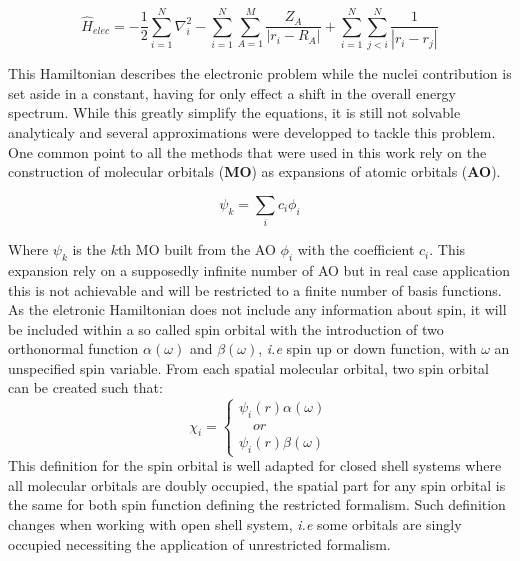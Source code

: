 \documentclass{article}
\begin{document}
\begin{equation}\label{Helec}
    \hat{H}_{elec}=-\frac{1}{2}\sum_{i=1}^{N}\nabla_i^2%
    -\sum_{i=1}^{N}\sum_{A=1}^{M}\frac{Z_A}{|r_i-R_A|}+\sum_{i=1}^{N}\sum_{j<i}^{N}\frac{1}{|r_i-r_j|}%
\end{equation}

This Hamiltonian describes the electronic problem while the nuclei contribution is set aside in a constant, having for only effect a shift in the overall energy spectrum. 
While this greatly simplify the equations, it is still not solvable analyticaly and several approximations were developped to tackle this problem. %
One common point to all the methods that were used in this work rely on the construction of molecular orbitals (\textbf{MO}) as expansions of atomic orbitals (\textbf{AO}).

\begin{equation}
    \psi_k=\sum_{i}c_i \phi_i
\end{equation}

Where $\psi_k$ is the $k$th MO built from the AO $\phi_i$ with the coefficient $c_i$. 
This expansion rely on a supposedly infinite number of AO but in real case application this is not achievable and will be restricted to a finite number of basis functions.
As the eletronic Hamiltonian does not include any information about spin, it will be included within a so called spin orbital with the introduction of two orthonormal function $\alpha(\omega)$ and $\beta(\omega)$, \textit{i.e} spin up or down function, with $\omega$ an unspecified spin variable.
From each spatial molecular orbital, two spin orbital can be created such that:
\begin{equation}
    \chi_i=\begin{cases}
    \psi_i(r)\alpha(\omega)\\
    \quad or \\
    \psi_i(r)\beta(\omega)
    \end{cases}
\end{equation}
This definition for the spin orbital is well adapted for closed shell systems where all molecular orbitals are doubly occupied, the spatial part for any spin orbital is the same for both spin function defining the restricted formalism.
Such definition changes when working with open shell system, \textit{i.e} some orbitals are singly occupied  necessiting the application of unrestricted formalism.
\end{document}
